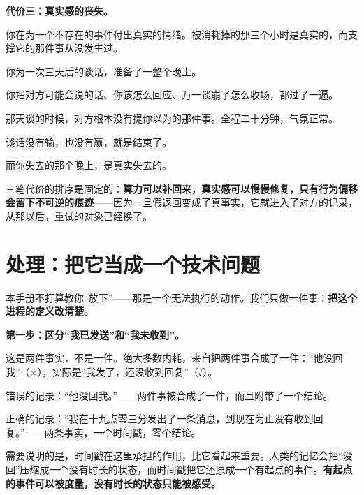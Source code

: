 \textbf{代价三：真实感的丧失。}

你在为一个不存在的事件付出真实的情绪。被消耗掉的那三个小时是真实的，而支撑它的那件事从没发生过。

\par
\begin{mdquote}
你为一次三天后的谈话，准备了一整个晚上。\par
\vspace{0.3\baselineskip}
你把对方可能会说的话、你该怎么回应、万一谈崩了怎么收场，都过了一遍。\par
\vspace{0.3\baselineskip}
那天谈的时候，对方根本没有提你以为的那件事。全程二十分钟，气氛正常。\par
\vspace{0.3\baselineskip}
谈话没有输，也没有赢，就是结束了。\par
\vspace{0.3\baselineskip}
而你失去的那个晚上，是真实失去的。
\end{mdquote}

三笔代价的排序是固定的：\textbf{算力可以补回来，真实感可以慢慢修复，只有行为偏移会留下不可逆的痕迹}——因为一旦假返回变成了真事实，它就进入了对方的记录，从那以后，重试的对象已经换了。

\section{处理：把它当成一个技术问题}

本手册不打算教你“放下”——那是一个无法执行的动作。我们只做一件事：\textbf{把这个进程的定义改清楚。}

\textbf{第一步：区分“我已发送”和“我未收到”。}

这是两件事实，不是一件。绝大多数内耗，来自把两件事合成了一件：“他没回我”（×），实际是“我发了，还没收到回复”（√）。

\par
\begin{mdquote}
错误的记录：“他没回我。”——两件事被合成了一件，而且附带了一个结论。\par
\vspace{0.3\baselineskip}
正确的记录：“我在十九点零三分发出了一条消息，到现在为止没有收到回复。”——两条事实，一个时间戳，零个结论。
\end{mdquote}

需要说明的是，时间戳在这里承担的作用，比它看起来重要。人类的记忆会把“没回”压缩成一个没有时长的状态，而时间戳把它还原成一个有起点的事件。\textbf{有起点的事件可以被度量，没有时长的状态只能被感受。}

